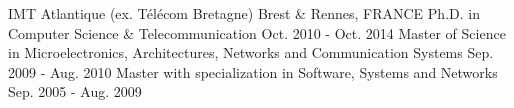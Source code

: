 \begin{cventries}
  \cventryedu
    {IMT Atlantique (ex. T\'{e}l\'{e}com Bretagne)}
    {Brest \& Rennes, FRANCE}
    {Ph.D. in Computer Science \& Telecommunication}
    {Oct. 2010 - Oct. 2014}
    {Master of Science in Microelectronics, Architectures, Networks and Communication Systems}
    {Sep. 2009 - Aug. 2010}
    {Master with specialization in Software, Systems and Networks}
    {Sep. 2005 - Aug. 2009}
\end{cventries}
